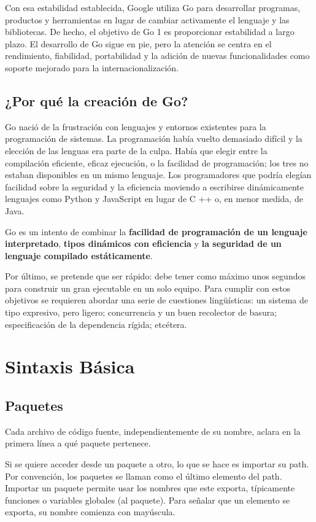 \documentclass{article}
\begin{document}
Con esa estabilidad establecida, Google utiliza Go para desarrollar programas, productos y herramientas en lugar de cambiar activamente el lenguaje y las bibliotecas. De hecho, el objetivo de Go 1 es proporcionar estabilidad a largo plazo. El desarrollo de Go sigue en pie, pero la atención se centra en el rendimiento, fiabilidad, portabilidad y la adición de nuevas funcionalidades como soporte mejorado para la internacionalización.
\subsection{¿Por qué la creación de Go?}

Go nació de la frustración con lenguajes y entornos existentes para la programación de sistemas. La programación había vuelto demasiado difícil y la elección de las lenguas era parte de la culpa. Había que elegir entre la compilación eficiente, eficaz ejecución, o la facilidad de programación; los tres no estaban disponibles en un mismo lenguaje. Los programadores que podría elegían facilidad sobre la seguridad y la eficiencia moviendo a escribirse dinámicamente lenguajes como Python y JavaScript en lugar de C ++ o, en menor medida, de Java. 

Go es un intento de combinar la \textbf{facilidad de programación de un lenguaje interpretado}, \textbf{tipos dinámicos con eficiencia} y \textbf{la seguridad de un lenguaje compilado estáticamente}. 

Por último, se pretende que ser rápido: debe tener como máximo unos segundos para construir un gran ejecutable en un solo equipo. Para cumplir con estos objetivos se requieren abordar una serie de cuestiones lingüísticas: un sistema de tipo expresivo, pero ligero; concurrencia y un buen recolector de basura; especificación de la dependencia rígida; etcétera.

\section{Sintaxis Básica}
\subsection{Paquetes}
Cada archivo de código fuente, independientemente de su nombre, aclara en la primera línea a qué paquete pertenece.

Si se quiere acceder desde un paquete a otro, lo que se hace es importar su path. Por convención, los paquetes se llaman como el último elemento del path. Importar un paquete permite usar los nombres que este exporta, típicamente funciones o variables globales (al paquete). Para señalar que un elemento se exporta, su nombre comienza con mayúscula.
\end{document}
